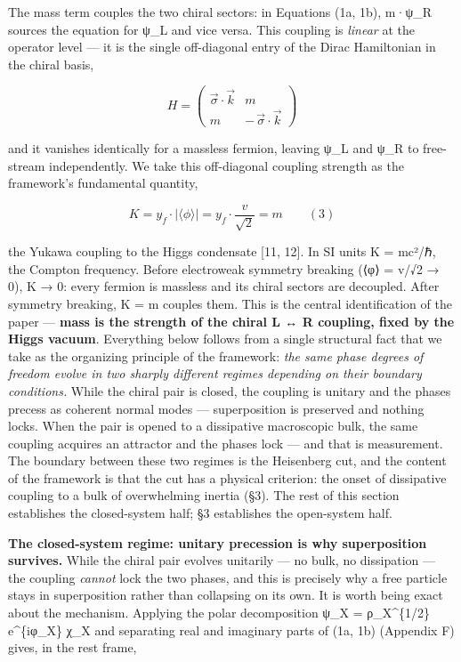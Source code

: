 \documentclass[
]{article}
\begin{document}
The mass term couples the two chiral sectors: in Equations (1a, 1b),
m·ψ\_R sources the equation for ψ\_L and vice versa. This coupling is
\emph{linear} at the operator level --- it is the single off-diagonal
entry of the Dirac Hamiltonian in the chiral basis,

\[H = \begin{pmatrix} \vec{\sigma}\cdot\vec{k} & m \\ m & -\,\vec{\sigma}\cdot\vec{k} \end{pmatrix}\]

and it vanishes identically for a massless fermion, leaving ψ\_L and
ψ\_R to free-stream independently. We take this off-diagonal coupling
strength as the framework's fundamental quantity,

\[\boxed{K = y_f \cdot |\langle\phi\rangle| = y_f \cdot \frac{v}{\sqrt{2}} = m} \qquad (3)\]

the Yukawa coupling to the Higgs condensate {[}11, 12{]}. In SI units K
= mc²/ℏ, the Compton frequency. Before electroweak symmetry breaking
(⟨φ⟩ = v/√2 → 0), K → 0: every fermion is massless and its chiral
sectors are decoupled. After symmetry breaking, K = m couples them. This
is the central identification of the paper --- \textbf{mass is the
strength of the chiral L ↔ R coupling, fixed by the Higgs vacuum}.
Everything below follows from a single structural fact that we take as
the organizing principle of the framework: \emph{the same phase degrees
of freedom evolve in two sharply different regimes depending on their
boundary conditions.} While the chiral pair is closed, the coupling is
unitary and the phases precess as coherent normal modes ---
superposition is preserved and nothing locks. When the pair is opened to
a dissipative macroscopic bulk, the same coupling acquires an attractor
and the phases lock --- and that is measurement. The boundary between
these two regimes is the Heisenberg cut, and the content of the
framework is that the cut has a physical criterion: the onset of
dissipative coupling to a bulk of overwhelming inertia (§3). The rest of
this section establishes the closed-system half; §3 establishes the
open-system half.

\textbf{The closed-system regime: unitary precession is why
superposition survives.} While the chiral pair evolves unitarily --- no
bulk, no dissipation --- the coupling \emph{cannot} lock the two phases,
and this is precisely why a free particle stays in superposition rather
than collapsing on its own. It is worth being exact about the mechanism.
Applying the polar decomposition ψ\_X = ρ\_X\^{}\{1/2\} e\^{}\{iφ\_X\}
χ\_X and separating real and imaginary parts of (1a, 1b) (Appendix F)
gives, in the rest frame,
\end{document}
